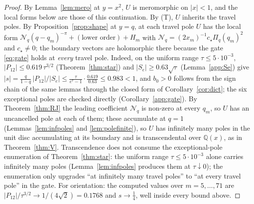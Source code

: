 \documentclass[11pt]{article}
\theoremstyle{plain}
\theoremstyle{definition}
\theoremstyle{remark}
\newcommand{\Q}{\mathbb{Q}}
\begin{document}
\begin{proof}
By Lemma~\ref{lem:mero} at $y=x^2$, $U$ is meromorphic on $|x|<1$, and the local forms below are
those of this continuation. By \textup{(T)}, $U$ inherits the travel poles. By Proposition~\ref{prop:shape} at $y=q$, at each
travel pole $U$ has the local form $\mathcal N_q(q-q_m)^{-\pi}+(\text{lower order})+H_m$ with
$\mathcal N_q=(2x_m)^{-1}c_\star\Pi_q(q_m)^2$ and $c_\star\ne0$; the boundary vectors are holomorphic there
because the gate \eqref{eq:gate} holds at \emph{every} travel pole. Indeed, on the uniform range
$\tau\le5\cdot10^{-3}$, $|P_{12}|\le0.619\,\tau^{3/2}$ (Theorem~\ref{thm:star}) and
$|S_e|\ge0.63\sqrt\tau$ (Lemma~\ref{app:Se}) give
$|s|=\tfrac{q}{1-q}\,|P_{12}|/|S_e|\le\tfrac{\tau}{e^\tau-1}\cdot\tfrac{0.619}{0.63}\le0.983<1$,
and $b_0>0$ follows from the sign chain of the same lemmas through the closed form of
Corollary~\ref{cor:dict}; the six exceptional poles are checked directly
(Corollary~\ref{app:gate}). By Theorem~\ref{thm:RJ} the leading coefficient $\mathcal N_q$ is
non-zero at every $q_m$, so $U$ has an uncancelled pole at each of them; these accumulate at
$q=1$ (Lemmas~\ref{lem:infpoles} and \ref{lem:polefinite}), so $U$ has infinitely many poles in
the unit disc accumulating at its boundary and is transcendental over $\Q(x)$, as in
Theorem~\ref{thm:V}. Transcendence does not consume the exceptional-pole enumeration of
Theorem~\ref{thm:star}: the uniform range $\tau\le5\cdot10^{-3}$ alone carries infinitely many
poles (Lemma~\ref{lem:infpoles} produces them at $\tau\downarrow0$); the enumeration only upgrades
``at infinitely many travel poles'' to ``at every travel pole'' in the gate. For orientation: the
computed values over $m=5,\dots,71$ are $|P_{12}|/\tau^{3/2}\to1/(4\sqrt2)=0.1768$ and
$s\to\tfrac14$, well inside every bound above.
\end{proof}
\end{document}
